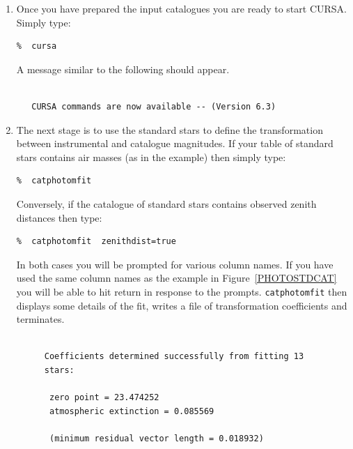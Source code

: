 \documentclass[twoside,11pt]{article}
\newcommand{\xref}[3]{#1}
\begin{document}
\begin{enumerate}
\begin{description}
  \end{description}

  \item Once you have prepared the input catalogues you are ready to
   start CURSA.  Simply type:

\begin{verbatim}
%  cursa
\end{verbatim}

   A message similar to the following should appear.

\begin{verbatim}

   CURSA commands are now available -- (Version 6.3)

\end{verbatim}

  \item The next stage is to use the standard stars to define the
   transformation between instrumental and catalogue magnitudes.
   If your table of standard stars contains air masses (as in the
   example) then simply type:

\begin{verbatim}
%  catphotomfit
\end{verbatim}

   Conversely, if the catalogue of standard stars contains observed
   zenith distances then type:

\begin{verbatim}
%  catphotomfit  zenithdist=true
\end{verbatim}

   In both cases you will be prompted for various column names.  If
   you have used the same column names as the example in
   Figure~\ref{PHOTOSTDCAT} you will be able to hit return in response
   to the prompts.  \xref{{\tt catphotomfit}}{sun190}{CATPHOTOMFIT}
   then displays some details of the fit, writes a file of transformation
   coefficients and terminates.

\begin{figure}[htbp]

\begin{verbatim}

Coefficients determined successfully from fitting 13 stars:

 zero point = 23.474252
 atmospheric extinction = 0.085569

 (minimum residual vector length = 0.018932)


\end{verbatim}
\end{figure}
\end{enumerate}
\end{document}
